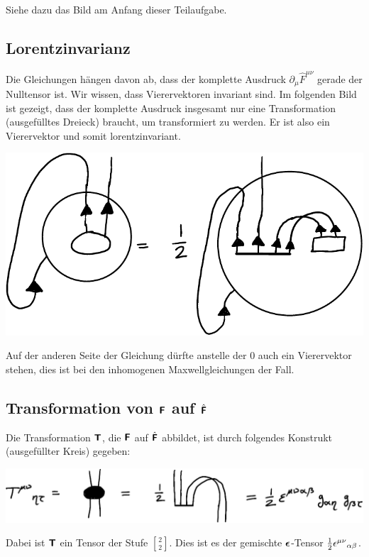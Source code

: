 Siehe dazu das Bild am Anfang dieser Teilaufgabe.

\subsection{Lorentzinvarianz}

Die Gleichungen hängen davon ab, dass der komplette Ausdruck $\partial_\mu \hat
F^{\mu\nu}$ gerade der Nulltensor ist. Wir wissen, dass Vierervektoren
invariant sind. Im folgenden Bild ist gezeigt, dass der komplette Ausdruck
insgesamt nur eine Transformation (ausgefülltes Dreieck) braucht, um
transformiert zu werden. Er ist also ein Vierervektor und somit
lorentzinvariant.
\begin{center}
	\includegraphics{H1-Penrose-7-crop.pdf}
\end{center}

Auf der anderen Seite der Gleichung dürfte anstelle der 0 auch ein Vierervektor
stehen, dies ist bei den inhomogenen Maxwellgleichungen der Fall.

\subsection{Transformation von $\boldsymbol{\mathsf{F}}$ auf $\hat{\boldsymbol{\mathsf{F}}}$}

Die Transformation $\boldsymbol{\mathsf{T}}$, die $\boldsymbol{\mathsf{F}}$ auf $\hat{\boldsymbol{\mathsf{F}}}$ abbildet, ist
durch folgendes Konstrukt (ausgefüllter Kreis) gegeben:
\begin{center}
	\includegraphics{H1-Penrose-8-crop.pdf}
\end{center}

Dabei ist $\boldsymbol{\mathsf{T}}$ ein Tensor der Stufe ${2 \brack 2}$. Dies ist es der
gemischte $\boldsymbol{\mathsf{\epsilon}}$-Tensor $\frac 12 \epsilon^{\mu\nu}{}_{\alpha\beta}$.

